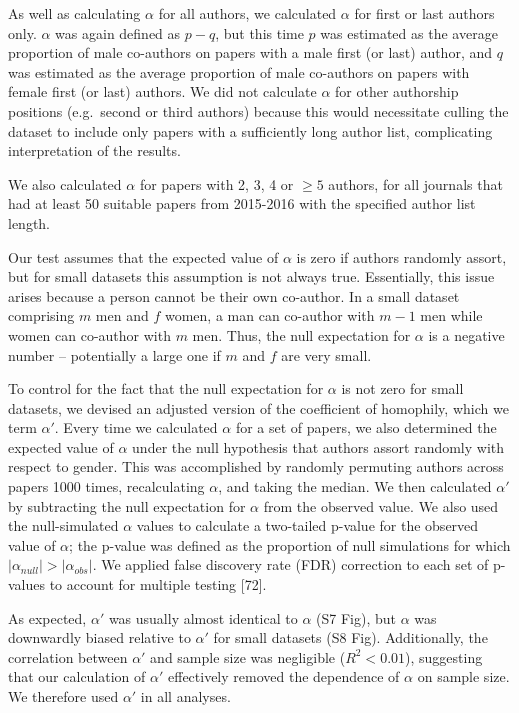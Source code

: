 \documentclass[12pt,]{article}
\begin{document}
As well as calculating \(\alpha\) for all authors, we calculated
\(\alpha\) for first or last authors only. \(\alpha\) was again defined
as \(p - q\), but this time \(p\) was estimated as the average
proportion of male co-authors on papers with a male first (or last)
author, and \(q\) was estimated as the average proportion of male
co-authors on papers with female first (or last) authors. We did not
calculate \(\alpha\) for other authorship positions (e.g.~second or
third authors) because this would necessitate culling the dataset to
include only papers with a sufficiently long author list, complicating
interpretation of the results.

We also calculated \(\alpha\) for papers with 2, 3, 4 or \({\ge}5\)
authors, for all journals that had at least 50 suitable papers from
2015-2016 with the specified author list length.

Our test assumes that the expected value of \(\alpha\) is zero if
authors randomly assort, but for small datasets this assumption is not
always true. Essentially, this issue arises because a person cannot be
their own co-author. In a small dataset comprising \(m\) men and \(f\)
women, a man can co-author with \(m - 1\) men while women can co-author
with \(m\) men. Thus, the null expectation for \(\alpha\) is a negative
number -- potentially a large one if \(m\) and \(f\) are very small.

To control for the fact that the null expectation for \(\alpha\) is not
zero for small datasets, we devised an adjusted version of the
coefficient of homophily, which we term \(\alpha'\). Every time we
calculated \(\alpha\) for a set of papers, we also determined the
expected value of \(\alpha\) under the null hypothesis that authors
assort randomly with respect to gender. This was accomplished by
randomly permuting authors across papers 1000 times, recalculating
\(\alpha\), and taking the median. We then calculated \(\alpha'\) by
subtracting the null expectation for \(\alpha\) from the observed value.
We also used the null-simulated \(\alpha\) values to calculate a
two-tailed p-value for the observed value of \(\alpha\); the p-value was
defined as the proportion of null simulations for which
\(|\alpha_{null}| > |\alpha_{obs}|\). We applied false discovery rate
(FDR) correction to each set of p-values to account for multiple testing
{[}72{]}.

As expected, \(\alpha'\) was usually almost identical to \(\alpha\) (S7
Fig), but \(\alpha\) was downwardly biased relative to \(\alpha'\) for
small datasets (S8 Fig). Additionally, the correlation between
\(\alpha'\) and sample size was negligible (\(R^2 < 0.01\)), suggesting
that our calculation of \(\alpha'\) effectively removed the dependence
of \(\alpha\) on sample size. We therefore used \(\alpha'\) in all
analyses.
\end{document}

